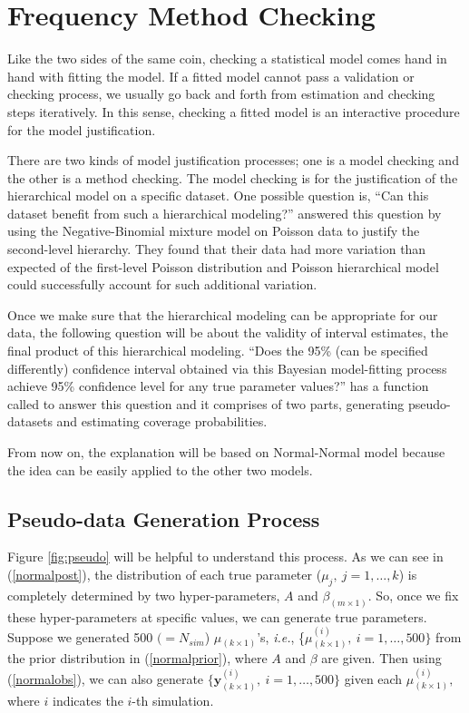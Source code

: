 \documentclass[article]{jss}
\begin{document}
\section[Frequency Method Checking]{Frequency Method Checking}
Like the two sides of the same coin, checking a statistical model comes hand in hand with fitting the model. If a fitted model cannot pass a validation or checking process, we usually go back and forth from estimation and checking steps iteratively. In this sense, checking a fitted model is an interactive procedure for the model justification.


There are two kinds of model justification processes; one is a model checking and the other is a method checking. The model checking is for the justification of the hierarchical model on a specific dataset. One possible question is, ``Can this dataset benefit from such a hierarchical modeling?'' \cite{1997} answered this question by using the Negative-Binomial mixture model on Poisson data to justify the second-level hierarchy. They found that their data had more variation than expected of the first-level Poisson distribution and Poisson hierarchical model could successfully account for such additional variation.


Once we make sure that the hierarchical modeling can be appropriate for our data, the following question will be about the validity of interval estimates, the final product of this hierarchical modeling. ``Does the 95\% (can be specified differently) confidence interval obtained via this Bayesian model-fitting process achieve 95\% confidence level  for any true parameter values?''  has a function called  to answer this question and it comprises of two parts, generating pseudo-datasets and estimating coverage probabilities.

From now on, the explanation will be based on Normal-Normal model because the idea can be easily applied to the other two models.

\subsection{Pseudo-data Generation Process}
Figure \ref{fig:pseudo} will be helpful to understand this process. As we can see in (\ref{normalpost}), the distribution of each true parameter ($\mu_{j},~j=1,\ldots, k$) is completely determined by two hyper-parameters, $A$ and $\beta_{(m\times1)}$. So, once we fix these hyper-parameters at specific values, we can generate true parameters. Suppose we generated 500 $(=N_{sim}$) {\boldmath $\mu$}$_{(k\times1)}$'s, \emph{i.e.}, \{{\boldmath $\mu$}$^{(i)}_{(k\times1)},~i=1, \ldots, 500\}$ from the prior distribution in (\ref{normalprior}), where $A$ and $\beta$ are given. Then using (\ref{normalobs}), we can also generate $\{\mathbf{y}^{(i)}_{(k\times1)},~i=1, \ldots, 500\}$ given each {\boldmath$\mu$}$^{(i)}_{(k\times1)}, $ where $i$ indicates the $i$-th simulation. 
\end{document}

